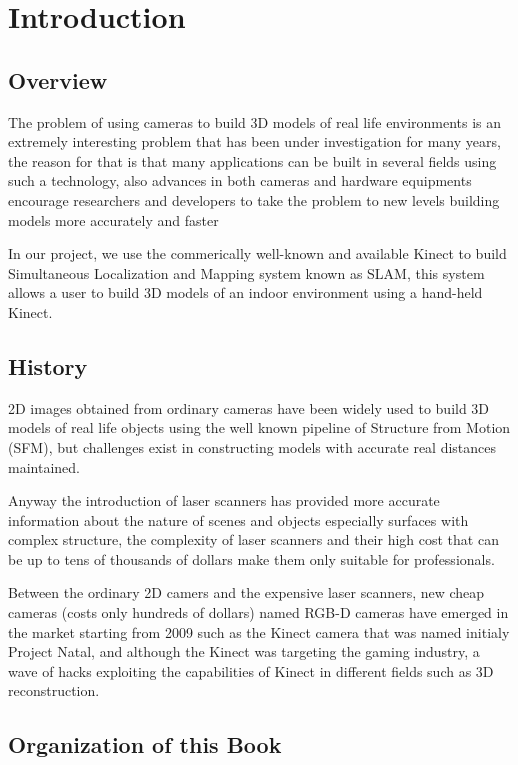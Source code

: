 \chapter{Introduction}
\section{Overview}

The problem of using cameras to build 3D models of real life environments is
an extremely interesting problem that has been under investigation for many years, the reason for that is that many applications can be built in several
fields using such a technology, also advances in both cameras and hardware equipments encourage researchers and developers to take the problem to new levels building models more accurately and faster

In our project, we use the commerically well-known and available Kinect to build Simultaneous Localization and Mapping system known as SLAM, this system allows
a user to build 3D models of an indoor environment using a hand-held Kinect.

\section{History}

2D images obtained from ordinary cameras have been widely used to build 3D models of real life objects using the well known pipeline of Structure from Motion (SFM), but challenges exist in constructing models with accurate real distances maintained.

Anyway the introduction of laser scanners has provided more accurate information about the nature of scenes and objects especially surfaces with complex structure, the complexity of laser scanners and their high cost that can be up to tens of thousands of dollars make them only suitable for professionals.

Between the ordinary 2D camers and the expensive laser scanners, new cheap cameras (costs only hundreds of dollars) named RGB-D cameras have emerged in the market starting from 2009 such as the Kinect camera that was named initialy Project Natal, and although the Kinect was targeting the gaming industry, a wave of hacks exploiting the capabilities of Kinect in different fields such as 3D reconstruction.

\section{Organization of this Book}

